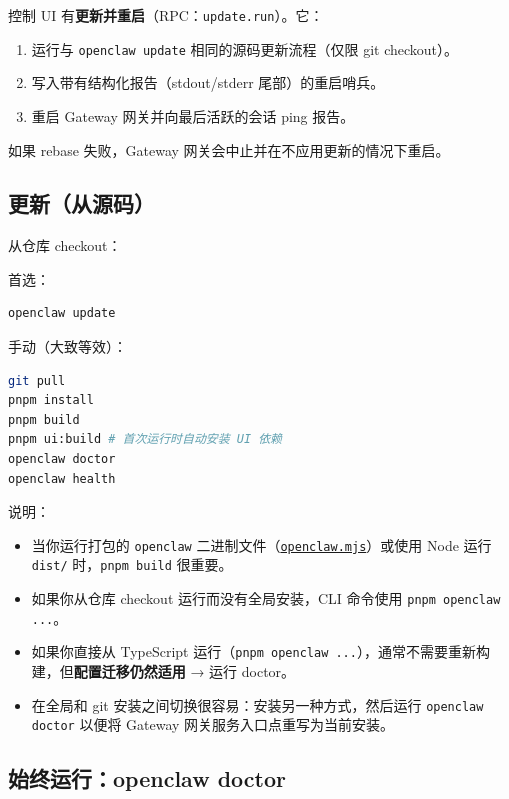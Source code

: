 控制 UI 有\textbf{更新并重启}（RPC：\texttt{update.run}）。它：

\begin{enumerate}
  \item 运行与 \texttt{openclaw update} 相同的源码更新流程（仅限 git checkout）。
  \item 写入带有结构化报告（stdout/stderr 尾部）的重启哨兵。
  \item 重启 Gateway 网关并向最后活跃的会话 ping 报告。
\end{enumerate}


如果 rebase 失败，Gateway 网关会中止并在不应用更新的情况下重启。

\subsection{更新（从源码）}


从仓库 checkout：

首选：

\begin{lstlisting}[language=bash]
openclaw update
\end{lstlisting}


手动（大致等效）：

\begin{lstlisting}[language=bash]
git pull
pnpm install
pnpm build
pnpm ui:build # 首次运行时自动安装 UI 依赖
openclaw doctor
openclaw health
\end{lstlisting}


说明：

\begin{itemize}
  \item 当你运行打包的 \texttt{openclaw} 二进制文件（\href{https://github.com/openclaw/openclaw/blob/main/openclaw.mjs}{\texttt{openclaw.mjs}}）或使用 Node 运行 \texttt{dist/} 时，\texttt{pnpm build} 很重要。
  \item 如果你从仓库 checkout 运行而没有全局安装，CLI 命令使用 \texttt{pnpm openclaw ...}。
  \item 如果你直接从 TypeScript 运行（\texttt{pnpm openclaw ...}），通常不需要重新构建，但\textbf{配置迁移仍然适用} → 运行 doctor。
  \item 在全局和 git 安装之间切换很容易：安装另一种方式，然后运行 \texttt{openclaw doctor} 以便将 Gateway 网关服务入口点重写为当前安装。
\end{itemize}


\subsection{始终运行：openclaw doctor}


